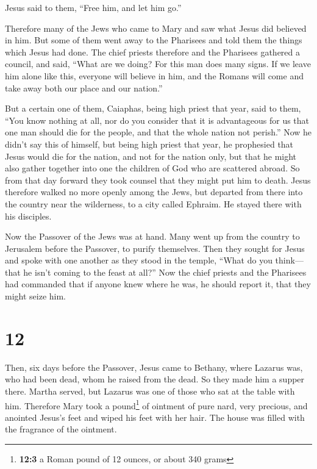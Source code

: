 Jesus said to them, ``Free him, and let him go.''

 Therefore many of the Jews who came to Mary and saw what
Jesus did believed in him.  But some of them went away to
the Pharisees and told them the things which Jesus had done.
 The chief priests therefore and the Pharisees gathered a
council, and said, ``What are we doing? For this man does many signs.
 If we leave him alone like this, everyone will believe
in him, and the Romans will come and take away both our place and our
nation.''

 But a certain one of them, Caiaphas, being high priest
that year, said to them, ``You know nothing at all,  nor
do you consider that it is advantageous for us that one man should die
for the people, and that the whole nation not perish.'' 
Now he didn't say this of himself, but being high priest that year, he
prophesied that Jesus would die for the nation,  and not
for the nation only, but that he might also gather together into one the
children of God who are scattered abroad.  So from that
day forward they took counsel that they might put him to death.
 Jesus therefore walked no more openly among the Jews,
but departed from there into the country near the wilderness, to a city
called Ephraim. He stayed there with his disciples.

 Now the Passover of the Jews was at hand. Many went up
from the country to Jerusalem before the Passover, to purify themselves.
 Then they sought for Jesus and spoke with one another as
they stood in the temple, ``What do you think---that he isn't coming to
the feast at all?''  Now the chief priests and the
Pharisees had commanded that if anyone knew where he was, he should
report it, that they might seize him.

\hypertarget{section-11}{%
\section{12}\label{section-11}}

 Then, six days before the Passover, Jesus came to
Bethany, where Lazarus was, who had been dead, whom he raised from the
dead.  So they made him a supper there. Martha served, but
Lazarus was one of those who sat at the table with him. 
Therefore Mary took a pound\footnote{\textbf{12:3} a Roman pound of 12
  ounces, or about 340 grams} of ointment of pure nard, very precious,
and anointed Jesus's feet and wiped his feet with her hair. The house
was filled with the fragrance of the ointment.

